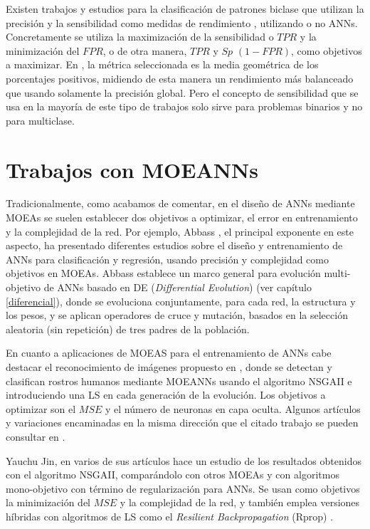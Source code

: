 Existen trabajos y estudios para la clasificación de patrones biclase que utilizan la
precisión y la sensibilidad como medidas de rendimiento \cite{Jin2006b},
utilizando o no ANNs. Concretamente se utiliza la maximización de la
sensibilidad o $TPR$ y la minimización del $FPR$, o de otra manera, $TPR$ y $Sp$
$\left(1-FPR\right)$, como objetivos a maximizar. En \cite{AlbertoF2009}, la métrica
seleccionada es la media geométrica de los porcentajes positivos, midiendo de esta manera
un rendimiento más balanceado que usando solamente la precisión global. Pero el
concepto de sensibilidad que se usa en la mayoría de este tipo de trabajos solo sirve para
problemas binarios y no para multiclase.

\section{Trabajos con MOEANNs}
\noindent Tradicionalmente, como acabamos de comentar, en el diseño de ANNs mediante MOEAs
se suelen establecer dos objetivos a optimizar, el error en entrenamiento y la complejidad
de la red. Por ejemplo, Abbass \cite{Abbass2001,Abbass2003}, el principal exponente en
este aspecto, ha presentado diferentes estudios sobre el diseño y entrenamiento de ANNs
para clasificación y regresión, usando precisión y complejidad como objetivos en MOEAs.
Abbass establece un marco general para evolución multi-objetivo de ANNs basado en
DE (\textit{Differential Evolution}) \cite{Price2005} (ver capítulo \ref{diferencial}), donde se
evoluciona conjuntamente, para cada red, la estructura y los pesos, y se aplican operadores de cruce
y mutación, basados en la selección aleatoria (sin repetición) de tres padres de la población.

En cuanto a aplicaciones de MOEAS para el entrenamiento de ANNs cabe destacar el
reconocimiento de imágenes propuesto en \cite{Wiegand2004}, donde se detectan y clasifican rostros
humanos mediante MOEANNs usando el algoritmo NSGAII e introduciendo una LS en cada generación de
la evolución. Los objetivos a optimizar son el $MSE$ y el número de neuronas en capa
oculta. Algunos artículos y variaciones encaminadas en la misma dirección que el citado
trabajo se pueden consultar en \cite{Roth2006,Gepperth2006}.

Yauchu Jin, en varios de sus artículos \cite{Jin2004,Jin2005,Jin2006} hace un estudio de
los resultados obtenidos con el algoritmo NSGAII, comparándolo con otros MOEAs y con
algoritmos mono-objetivo con término de regularización para ANNs. Se usan como objetivos la
minimización del $MSE$ y la complejidad de la red, y también emplea versiones híbridas con
algoritmos de LS como el \textit{Resilient Backpropagation} (Rprop) \cite{Riedmiller1993}.

